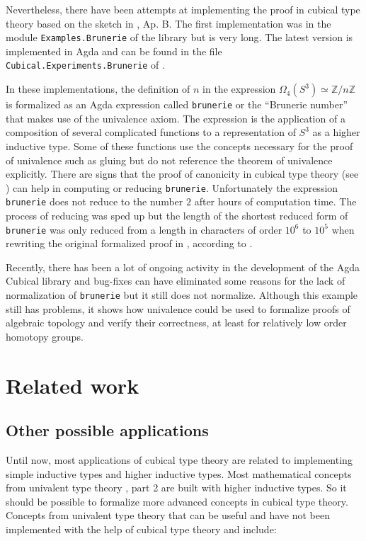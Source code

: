 \documentclass[12pt,a4paper,twoside,xetex]{book} %
\begin{document}
Nevertheless, there have been attempts at implementing the proof in cubical type 
theory based on the sketch in \cite{Brunerie2016}, Ap. B. The first 
implementation was in the module \texttt{Examples.Brunerie} of the library 
\cite{Moertberg2015} but is very long. The latest version is implemented in Agda 
and can be found in the file  \texttt{Cubical.Experiments.Brunerie} of 
\cite{Moertberg2018}. 

In these implementations, the definition of  $n$ in the expression 
$\Omega_4(S^3) \simeq \mathbb{Z}/n\mathbb{Z}$ is formalized as an Agda 
expression called \texttt{brunerie} or the ``Brunerie number'' that makes use 
of the univalence axiom. The expression is the application of a composition of 
several complicated functions to a representation of $S^3$ as a higher 
inductive type. Some of these functions use the concepts necessary for the proof 
of univalence such as gluing but do not reference the theorem of 
univalence explicitly. There are signs that the proof of canonicity in 
cubical type theory (see ) can help in computing 
or reducing \texttt{brunerie}. Unfortunately the expression 
\texttt{brunerie} does not reduce to the number $2$ after hours of 
computation time. The process of reducing was sped up but the length of the
shortest reduced form of  \texttt{brunerie} was  only 
reduced from a length in characters of order $10^6$ to $10^5$ when rewriting 
the original formalized proof \cite{Moertberg2015} in \cite{Moertberg2018},  
according to \cite{Brunerie2018}.

Recently, there has been a lot of ongoing activity in the development of the 
Agda Cubical library and bug-fixes can have eliminated some reasons for the lack 
of normalization of \texttt{brunerie} but it still does not normalize. Although this example still has problems, 
it shows how univalence could be used to formalize proofs of algebraic topology 
and verify their correctness, at least for relatively low order homotopy groups.

\chapter{Related work}

\section{Other possible applications}\label{futapp}

Until now, most applications of cubical type theory are related to implementing 
simple inductive types and higher inductive types. Most mathematical concepts 
from univalent type theory \cite{Voevodsky2013}, part 2 are built with higher 
inductive types. So it should be possible to formalize more advanced concepts in 
cubical type theory. Concepts from univalent type theory that can be useful and 
have not been implemented with the help of cubical type theory and 
\cite{Moertberg2018} include:
\end{document}

